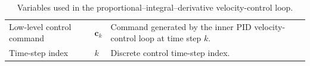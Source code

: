 \documentclass[a4paper]{article}
\begin{document}
\begin{table}[H]
\begin{tabular}{p{} p{} p{}}
         Low-level control command
         & $\mathbf{c}_k$
         & Command generated by the inner PID velocity-control loop at time step $k$. \\

         Time-step index
         & $k$
         & Discrete control time-step index. \\

         \hline
      \end{tabular}

      \caption{Variables used in the proportional--integral--derivative velocity-control loop.}
      \label{tab:pid-controller-variables}
   \end{table}

   
   
\end{document}
